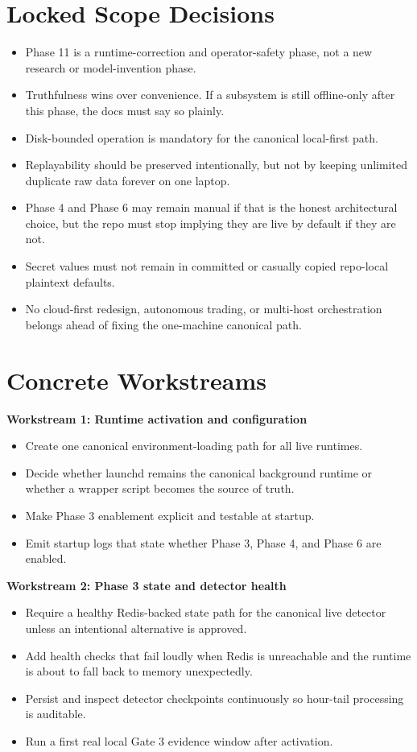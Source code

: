 \documentclass{article}
\begin{document}
\section*{Locked Scope Decisions}
\begin{itemize}
\item Phase 11 is a runtime-correction and operator-safety phase, not a new research or model-invention phase.
\item Truthfulness wins over convenience. If a subsystem is still offline-only after this phase, the docs must say so plainly.
\item Disk-bounded operation is mandatory for the canonical local-first path.
\item Replayability should be preserved intentionally, but not by keeping unlimited duplicate raw data forever on one laptop.
\item Phase 4 and Phase 6 may remain manual if that is the honest architectural choice, but the repo must stop implying they are live by default if they are not.
\item Secret values must not remain in committed or casually copied repo-local plaintext defaults.
\item No cloud-first redesign, autonomous trading, or multi-host orchestration belongs ahead of fixing the one-machine canonical path.
\end{itemize}

\section*{Concrete Workstreams}
\textbf{Workstream 1: Runtime activation and configuration}
\begin{itemize}
\item Create one canonical environment-loading path for all live runtimes.
\item Decide whether launchd remains the canonical background runtime or whether a wrapper script becomes the source of truth.
\item Make Phase 3 enablement explicit and testable at startup.
\item Emit startup logs that state whether Phase 3, Phase 4, and Phase 6 are enabled.
\end{itemize}

\textbf{Workstream 2: Phase 3 state and detector health}
\begin{itemize}
\item Require a healthy Redis-backed state path for the canonical live detector unless an intentional alternative is approved.
\item Add health checks that fail loudly when Redis is unreachable and the runtime is about to fall back to memory unexpectedly.
\item Persist and inspect detector checkpoints continuously so hour-tail processing is auditable.
\item Run a first real local Gate 3 evidence window after activation.
\end{itemize}
\end{document}
